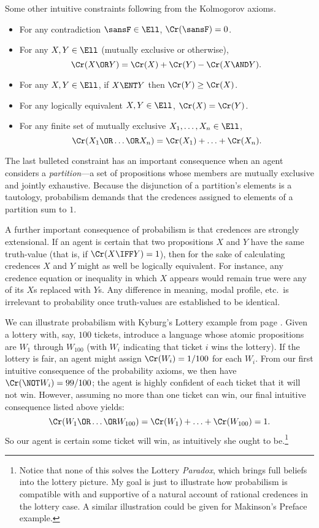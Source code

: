 Some other intuitive constraints following from the Kolmogorov axioms.
\begin{itemize}
\item For any contradiction $\sansF \in \Ell$, $\Cr(\sansF)=0$.
\item For any $X, Y \in \Ell$ (mutually exclusive or otherwise), $$\Cr(X \OR Y)=\Cr(X) + \Cr(Y) - \Cr(X \AND Y).$$
\item For any $X, Y \in \Ell$, if $X \ENT Y$ then $\Cr(Y) \ge \Cr(X)$.
\item For any logically equivalent $X, Y \in \Ell$, $\Cr(X)=\Cr(Y)$.
\item For any finite set of mutually exclusive $X_1, \ldots, X_n \in \Ell$, $$\Cr(X_1 \OR \ldots \OR X_n)=\Cr(X_1)+\ldots+\Cr(X_n).$$
\end{itemize}
The last bulleted constraint has an important consequence when an agent considers a \textit{partition}---a set of propositions whose members are mutually exclusive and jointly exhaustive. Because the disjunction of a partition's elements is a tautology, probabilism demands that the credences assigned to elements of a partition sum to $1$.
 
A further important consequence of probabilism is that credences are strongly extensional. If an agent is certain that two propositions $X$ and $Y$ have the same truth-value (that is, if $\Cr(X \IFF Y)=1$), then for the sake of calculating credences $X$ and $Y$ might as well be logically equivalent. For instance, any credence equation or inequality in which $X$ appears would remain true were any of its $X$s replaced with $Y$s. Any difference in meaning, modal profile, etc.\ is irrelevant to probability once truth-values are established to be identical.

We can illustrate probabilism with Kyburg's Lottery example from page \pageref{titelbaum-lottery}. Given a lottery with, say, $100$ tickets, introduce a language whose atomic propositions are $W_1$ through $W_{100}$ (with $W_i$ indicating that ticket $i$ wins the lottery). If the lottery is fair, an agent might assign $\Cr(W_i)=1/100$ for each $W_i$. From our first intuitive consequence of the probability axioms, we then have $\Cr(\NOT W_i)=99/100$; the agent is highly confident of each ticket that it will not win. However, assuming no more than one ticket can win, our final intuitive consequence listed above yields: 
\begin{equation}
\Cr(W_1 \OR \ldots \OR W_{100})= \Cr(W_1)+\ldots+\Cr(W_{100})=1.
\end{equation}
So our agent is certain some ticket will win, as intuitively she ought to be.\footnote
{Notice that none of this solves the Lottery \emph{Paradox}, which brings full beliefs into the lottery picture. My goal is just to illustrate how probabilism is compatible with and supportive of a natural account of rational credences in the lottery case. A similar illustration could be given for Makinson's Preface example.}

